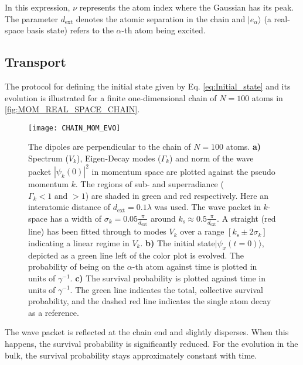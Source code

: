 \noindent
In this expression, \( \nu \) represents the atom index where the Gaussian has its peak.
The parameter \( d_\text{ext} \) denotes the atomic separation in the chain and
\( \vert e_\alpha \rangle \) (a real-space basis state) refers to the \( \alpha \)-th atom being excited.

\subsection{Transport}
The protocol for defining the initial state given by Eq. \eqref{eq:Initial_state} and its evolution is illustrated for a finite one-dimensional chain of $ N = 100 $ atoms in \autoref{fig:MOM_REAL_SPACE_CHAIN}.
\begin{figure}
    \centering
    \texttt{[image: CHAIN\_MOM\_EVO]}
    \caption{The dipoles are perpendicular to the chain of $N= 100$ atoms.
    \textbf{a)} Spectrum ($ V_k $), Eigen-Decay modes ($ \Gamma_k $) and norm of the wave packet $ |\psi_k(0)|^2 $ in momentum space are plotted against the pseudo momentum $k$.
    The regions of sub- and superradiance ($ \Gamma_k < 1 \text{ and } > 1$) are shaded in green and red respectively.
    Here an interatomic distance of $ d_\text{ext} = 0.1 \lambda$ was used.
    The wave packet in $k$-space has a width of $ \sigma_k = 0.05 \frac{\pi}{d_\text{ext}} $  around $ k_\text{s} \approx 0.5 \frac{\pi}{d_\text{ext}} $.
    A straight (red line) has been fitted through to modes $ V_k $ over a range $[k_\text{s} \pm 2\sigma_k]$
        indicating a linear regime in $ V_k $.
    \textbf{b)} The initial state$ \vert \psi_x(t = 0) \rangle $,
        depicted as a green line left of the color plot is evolved.
        The probability of being on the $ \alpha $-th atom against time is plotted in units of $ \gamma^{-1}$.
    \textbf{c)} The survival probability is plotted against time in units of $\gamma^{-1}$.
        The green line indicates the total, collective survival probability,
        and the dashed red line indicates the single atom decay as a reference.}
    \label{fig:MOM_REAL_SPACE_CHAIN}
\end{figure}

\noindent
The wave packet is reflected at the chain end and slightly disperses.
When this happens, the survival probability is significantly reduced.
For the evolution in the bulk, the survival probability stays approximately constant with time.

